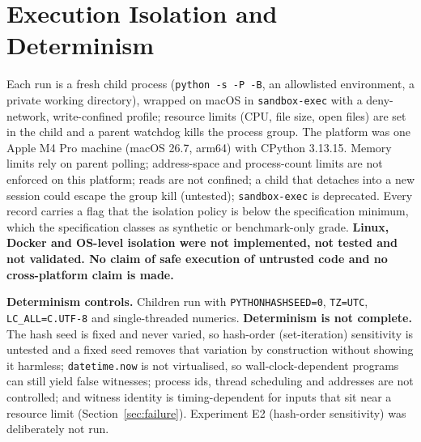 \section{Execution Isolation and Determinism}\label{sec:execution}
Each run is a fresh child process (\texttt{python -s -P -B}, an allowlisted environment, a private working directory), wrapped on macOS in \texttt{sandbox-exec} with a deny-network, write-confined profile; resource limits (CPU, file size, open files) are set in the child and a parent watchdog kills the process group. The platform was one Apple M4 Pro machine (macOS 26.7, arm64) with CPython 3.13.15. Memory limits rely on parent polling; address-space and process-count limits are not enforced on this platform; reads are not confined; a child that detaches into a new session could escape the group kill (untested); \texttt{sandbox-exec} is deprecated. Every record carries a flag that the isolation policy is below the specification minimum, which the specification classes as synthetic or benchmark-only grade. \textbf{Linux, Docker and OS-level isolation were not implemented, not tested and not validated. No claim of safe execution of untrusted code and no cross-platform claim is made.}

\textbf{Determinism controls.} Children run with \texttt{PYTHONHASHSEED=0}, \texttt{TZ=UTC}, \texttt{LC\_ALL=C.UTF-8} and single-threaded numerics. \textbf{Determinism is not complete.} The hash seed is fixed and never varied, so hash-order (set-iteration) sensitivity is untested and a fixed seed removes that variation by construction without showing it harmless; \texttt{datetime.now} is not virtualised, so wall-clock-dependent programs can still yield false witnesses; process ids, thread scheduling and addresses are not controlled; and witness identity is timing-dependent for inputs that sit near a resource limit (Section~\ref{sec:failure}). Experiment E2 (hash-order sensitivity) was deliberately not run.
